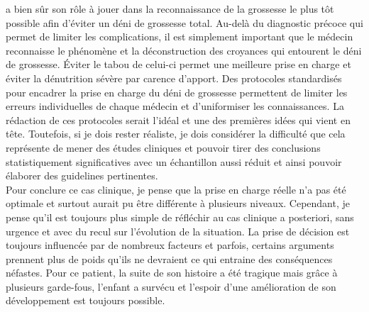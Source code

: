  a bien sûr son rôle à jouer dans la reconnaissance de la grossesse le plus tôt possible afin d’éviter un déni de grossesse total. Au-delà du diagnostic précoce qui permet de limiter les complications, il est simplement important que le médecin reconnaisse le phénomène et la déconstruction des croyances qui entourent le déni de grossesse. Éviter le tabou de celui-ci permet une meilleure prise en charge et éviter la dénutrition sévère par carence d’apport. Des protocoles standardisés pour encadrer la prise en charge du déni de grossesse permettent de limiter les erreurs individuelles de chaque médecin et d’uniformiser les connaissances. La rédaction de ces protocoles serait l’idéal et une des premières idées qui vient en tête. Toutefois, si je dois rester réaliste, je dois considérer la difficulté que cela représente de mener des études cliniques et pouvoir tirer des conclusions statistiquement significatives avec un échantillon aussi réduit et ainsi pouvoir élaborer des guidelines pertinentes.\\ 

Pour conclure ce cas clinique, je pense que la prise en charge réelle n’a pas été optimale et surtout aurait pu être différente à plusieurs niveaux. Cependant, je pense qu’il est toujours plus simple de réfléchir au cas clinique a posteriori, sans urgence et avec du recul sur l’évolution de la situation. La prise de décision est toujours influencée par de nombreux facteurs et parfois, certains arguments prennent plus de poids qu’ils ne devraient ce qui entraine des conséquences néfastes. Pour ce patient, la suite de son histoire a été tragique mais grâce à plusieurs garde-fous, l’enfant a survécu et l’espoir d’une amélioration de son développement est toujours possible.\\  
